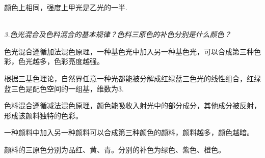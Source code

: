 \documentclass[UTF8]{ctexart}
\begin{document}
    颜色上相同，强度上甲光是乙光的一半.

    \emph{\\[0.02cm]3.色光混合及色料混合的基本规律？色料三原色的补色分别是什么颜色？}

    色光混合遵循加法混色原理，一种基色光中加入另一种基色光，可以合成第三种色彩，色光越多，色彩亮度越强。
    
    根据三基色理论，自然界任意一种光都能被分解成红绿蓝三色光的线性组合，红绿蓝三色是配色空间的一组基，维数为3.

    色料混合遵循减法混色原理，颜色能吸收入射光中的部分成分，其他成分被反射，形成该颜料独特的色彩。

    一种颜料中加入另一种颜料可以合成第三种颜色的颜料，颜料越多，颜色越暗。

    颜料的三原色分别为品红、黄、青。分别的补色为绿色、紫色、橙色。
    \nocite{dawushiyan}
    \nocite{shiyanjiaocheng}
    \nocite{jiangyi}
    
\end{document}

